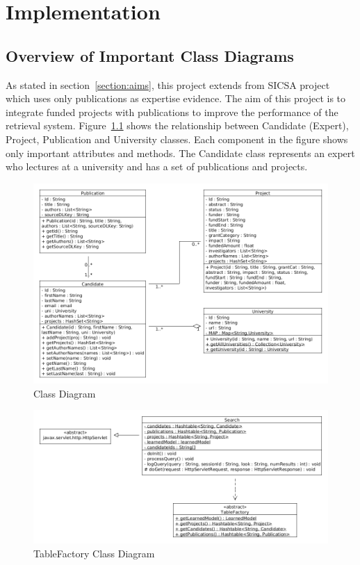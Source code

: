 
\chapter{Implementation}\label{section:implementation}

\section{Overview of Important Class Diagrams}

As stated in section~\ref{section:aims}, this project extends from SICSA project which uses only publications as expertise evidence.
The aim of this project is to integrate funded projects with publications to improve the performance of the retrieval system.
Figure~\ref{fig:classDiagram1} shows the relationship between Candidate (Expert), Project, Publication and University classes. Each component in the figure
shows only important attributes and methods. The Candidate class represents an expert who lectures at a university and has a set of publications and projects.
\begin{figure}
\centering
\includegraphics[scale=0.4]{./figures/classDiagram1.png}
\caption{Class Diagram} \label{fig:classDiagram1} 
\end{figure}

\begin{figure}
\centering
\includegraphics[scale=0.4]{./figures/tablefactory.png}
\caption{TableFactory Class Diagram} \label{fig:tableFactory} 
\end{figure}

